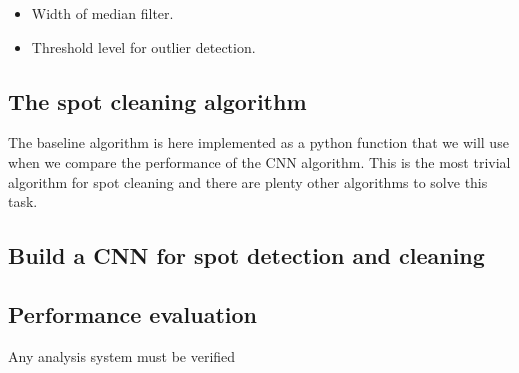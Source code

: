 \documentclass[letterpaper,10pt,english]{sphinxmanual}
\begin{document}
\begin{itemize}
\item {} 
 Width of median filter.

\item {} 
 Threshold level for outlier detection.

\end{itemize}


\subsection{The spot cleaning algorithm}
\label{\detokenize{ML4NeutronImageSegmentation:the-spot-cleaning-algorithm}}
The baseline algorithm is here implemented as a python function that we will use when we compare the performance of the CNN algorithm. This is the most trivial algorithm for spot cleaning and there are plenty other algorithms to solve this task.

\begin{sphinxVerbatim}[commandchars=\\\{\}]
    
      
        
    
            
    
     
\end{sphinxVerbatim}


\subsection{Build a CNN for spot detection and cleaning}
\label{\detokenize{ML4NeutronImageSegmentation:build-a-cnn-for-spot-detection-and-cleaning}}

\subsection{Performance evaluation}
\label{\detokenize{ML4NeutronImageSegmentation:performance-evaluation}}
Any analysis system must be verified
\end{document}
